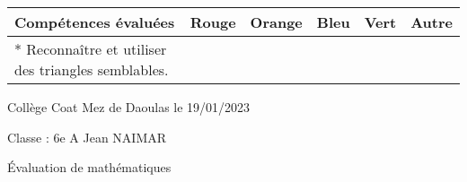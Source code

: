 \documentclass[a4paper,12pt,fleqn]{article}
\begin{document}
\begin{footnotesize}

\begin{center}

\begin{tabular}{|p{120mm}|p{8mm}|p{10mm}|p{8mm}|p{8mm}|p{8mm}|}

\hline
\textbf{Compétences évaluées} & \textbf{Rouge} & \textbf{Orange} & \textbf{Bleu} & \textbf{Vert} & \textbf{Autre} \\
\hline


*  Reconnaître et utiliser des triangles semblables.  & & & & & \\ 
\hline
\end{tabular}
\end{center}
\end{footnotesize}
 \par 
\medskip
\newpage
\setcounter{exo}{0}


Collège Coat Mez de Daoulas  \hfill  le 19/01/2023

Classe : 6e A \hfill Jean NAIMAR

\begin{center}
\begin{LARGE} Évaluation de mathématiques \end{LARGE}
\end{center}

\end{document}

